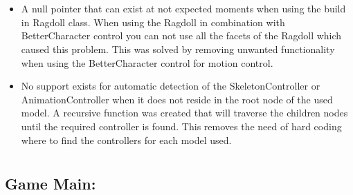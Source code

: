 \documentclass[letterpaper]{article}
\begin{document}
		\vspace{0.2in}
		\section*{\colorbox{black}{}}
		\vspace{0.1in}
			
			\begin{itemize}
				\item A null pointer that can exist at not expected moments when using the build in Ragdoll class. When using the Ragdoll in combination with BetterCharacter control you can not use all the facets of the Ragdoll which caused this problem. This was solved by removing unwanted functionality when using the BetterCharacter control for motion control.
				\item No support exists for automatic detection of the SkeletonController or AnimationController when it does not reside in the root node of the used model. A recursive function was created that will traverse the children nodes until the required controller is found. This removes the need of hard coding where to find the controllers for each model used.
			\end{itemize}
		
		\section*{\colorbox{black}{}} 
						\vspace{0.1in}
						
							\subsection*{Game Main:}
							\vspace{0.1in}
								
\end{document}
